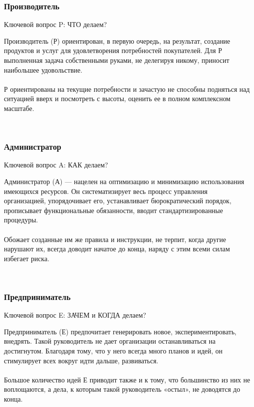 \documentclass{../industrial-development}
\begin{document}
{{{{{{{{{{{{{{{\begin{frame} \frametitle{Производитель}
	 \begin{block}{Ключевой вопрос P:}
		ЧТО делаем?
	\end{block}	
Производитель (Р) ориентирован, в первую очередь, на результат, создание продуктов и услуг для удовлетворения потребностей покупателей. Для Р выполненная задача собственными руками, не делегируя никому, приносит наибольшее удовольствие.\\~\\ Р ориентированы на текущие потребности и зачастую не способны подняться над ситуацией вверх и посмотреть с высоты, оценить ее в полном комплексном масштабе. 
\end{frame}
\lecturenotes
~\cite{How_to_be_a_good_IT-manager}

\begin{frame} \frametitle{Администратор}
	\begin{block}{Ключевой вопрос A:}
		КАК делаем?
	\end{block}	
Администратор (А) — нацелен на оптимизацию и минимизацию использования имеющихся ресурсов. Он систематизирует весь процесс управления организацией, упорядочивает его, устанавливает бюрократический порядок, прописывает функциональные обязанности, вводит стандартизированные процедуры.\\~\\ Обожает созданные им же правила и инструкции, не терпит, когда другие нарушают их, всегда доводит начатое до конца, наряду с этим всеми силам избегает риска.
\end{frame}
\lecturenotes
~\cite{How_to_be_a_good_IT-manager}

\begin{frame} \frametitle{Предприниматель}
	\begin{block}{Ключевой вопрос E:}
		ЗАЧЕМ и КОГДА делаем?
	\end{block}	
Предприниматель (Е) предпочитает генерировать новое, экспериментировать, внедрять. Такой руководитель не дает организации останавливаться на достигнутом. Благодаря тому, что у него всегда много планов и идей, он стимулирует всех вокруг идти дальше, развиваться.\\~\\ Большое количество идей Е приводит также и к тому, что большинство из них не воплощаются, а дела, к которым такой руководитель «остыл», не доводятся до конца. 
\end{frame}
\lecturenotes
~\cite{How_to_be_a_good_IT-manager}

}}}}}}}}}}}}}}}
\end{document}
